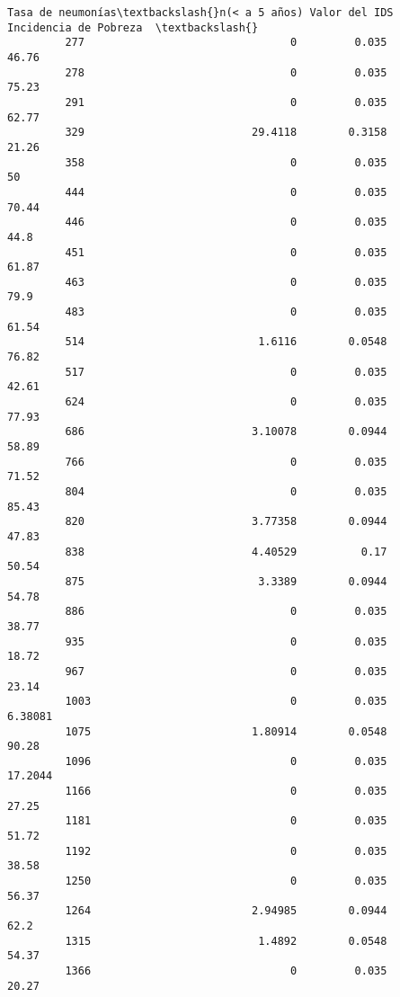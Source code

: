 \documentclass[11pt]{article}
\begin{document}
\begin{Verbatim}[commandchars=\\\{\}]
              Tasa de neumonías\textbackslash{}n(< a 5 años) Valor del IDS Incidencia de Pobreza  \textbackslash{}
         277                                0         0.035                 46.76   
         278                                0         0.035                 75.23   
         291                                0         0.035                 62.77   
         329                          29.4118        0.3158                 21.26   
         358                                0         0.035                    50   
         444                                0         0.035                 70.44   
         446                                0         0.035                  44.8   
         451                                0         0.035                 61.87   
         463                                0         0.035                  79.9   
         483                                0         0.035                 61.54   
         514                           1.6116        0.0548                 76.82   
         517                                0         0.035                 42.61   
         624                                0         0.035                 77.93   
         686                          3.10078        0.0944                 58.89   
         766                                0         0.035                 71.52   
         804                                0         0.035                 85.43   
         820                          3.77358        0.0944                 47.83   
         838                          4.40529          0.17                 50.54   
         875                           3.3389        0.0944                 54.78   
         886                                0         0.035                 38.77   
         935                                0         0.035                 18.72   
         967                                0         0.035                 23.14   
         1003                               0         0.035               6.38081   
         1075                         1.80914        0.0548                 90.28   
         1096                               0         0.035               17.2044   
         1166                               0         0.035                 27.25   
         1181                               0         0.035                 51.72   
         1192                               0         0.035                 38.58   
         1250                               0         0.035                 56.37   
         1264                         2.94985        0.0944                  62.2   
         1315                          1.4892        0.0548                 54.37   
         1366                               0         0.035                 20.27   
         

\end{Verbatim}
\end{document}
